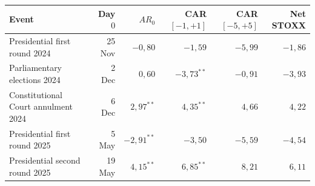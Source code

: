 {\footnotesize\setlength{\tabcolsep}{3pt}
\begin{tabular}{lrrrrr}
\toprule
Event & Day $0$ & $AR_0$ & CAR$[-1,+1]$ & CAR$[-5,+5]$ & Net STOXX \\
\midrule
Presidential first round 2024 & 25 Nov & $-0{,}80$ & $-1{,}59$ & $-5{,}99$ & $-1{,}86$ \\
Parliamentary elections 2024 & 2 Dec & $0{,}60$ & $-3{,}73^{**}$ & $-0{,}91$ & $-3{,}93$ \\
Constitutional Court annulment 2024 & 6 Dec & $2{,}97^{**}$ & $4{,}35^{**}$ & $4{,}66$ & $4{,}22$ \\
Presidential first round 2025 & 5 May & $-2{,}91^{**}$ & $-3{,}50$ & $-5{,}59$ & $-4{,}54$ \\
Presidential second round 2025 & 19 May & $4{,}15^{**}$ & $6{,}85^{**}$ & $8{,}21$ & $6{,}11$ \\
\bottomrule
\end{tabular}}

